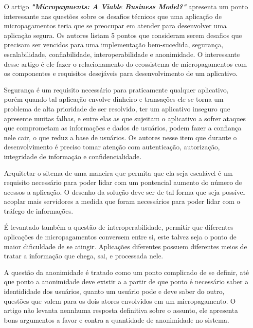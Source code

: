 \documentclass[hidelinks,12pt]{article}
\begin{document}
O artigo \textbf{\textit{"Micropayments: A Viable Business Model?"}} \cite{stanford} apresenta um ponto interessante nas quest\~oes sobre os desafios t\'ecnicos que uma aplica\c{c}\~ao de micropagamentos teria que se preocupar em atender para desenvolver uma aplica\c{c}\~ao segura. Os autores listam 5 pontos que consideram serem desafios que precisam ser vencidos para uma implementa\c{c}\~ao bem-sucedida, seguran\c{c}a, escalabilidade, confiabilidade, interoperabilidade e anonimidade. O interessante desse artigo \'e ele fazer o relacionamento do ecossistema de micropagamentos com os componentes e requisitos desej\'aveis para desenvolvimento de um aplicativo. 

Seguran\c{c}a \'e um requisito necess\'ario para praticamente qualquer aplicativo, por\'em quando tal aplica\c{c}\~ao envolve dinheiro e transa\c{c}\~oes ele se torna um problema de alta prioridade de ser resolvido, ter um aplicativo inseguro que apresente muitas falhas, e entre elas as que sujeitam o aplicativo a sofrer ataques que comprometam as informa\c{c}\~oes e dados de usu\'arios, podem fazer a confian\c{c}a nele cair, o que reduz a base de usu\'arios. Os autores nesse item que durante o desenvolvimento \'e preciso tomar aten\c{c}\~ao com autentica\c{c}\~ao, autoriza\c{c}\~ao, integridade de informa\c{c}\~ao e confidencialidade.

Arquitetar o sitema de uma maneira que permita que ela seja escal\'avel \'e um requisito necess\'ario para poder lidar com um pontencial aumento do número de acessos a aplica\c{c}\~ao. O desenho da solu\c{c}\~ao deve ser de tal forma que seja poss\'ivel acoplar mais servidores a medida que foram necess\'arios para poder lidar com o tr\'afego de informa\c{c}\~oes.

É levantado tamb\'em a quest\~ao de interoperabilidade, permitir que diferentes aplica\c{c}\~oes de micropagamentos conversem entre si, este talvez seja o ponto de maior dificuldade de se atingir. Aplica\c{c}\~oes diferentes possuem diferentes meios de tratar a informa\c{c}\~ao que chega, sai, e processada nele.


A quest\~ao da anonimidade \'e tratado como um ponto complicado de se definir, at\'e que ponto a anonimidade deve existir a a partir de que ponto \'e necess\'ario saber a identididade dos usu\'arios, quanto um usu\'ario pode e deve saber do outro, quest\~oes que valem para os dois atores envolvidos em um micropagamento. O artigo n\~ao levanta nennhuma resposta definitiva sobre o assunto, ele apresenta bons argumentos a favor e contra a quantidade de anonimidade no sistema.
\end{document}
